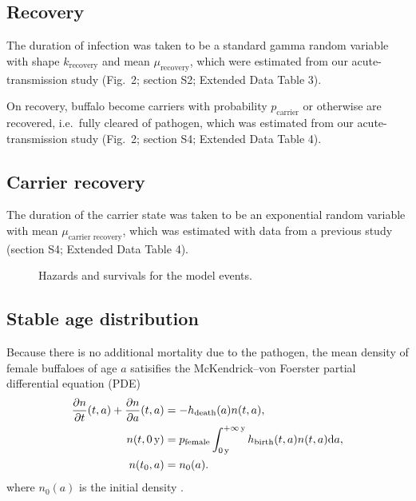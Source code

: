 \documentclass[12pt, USenglish]{article}  %
\newcommand{\md}{\mathrm{d}}
\begin{document}
\subsection{Recovery}

The duration of infection was taken to be a standard gamma random
variable with shape $k_{\text{recovery}}$ and mean
$\mu_{\text{recovery}}$, which were estimated from our
acute-transmission study (Fig.~2; section S2; Extended Data Table 3).

On recovery, buffalo become carriers with probability
$p_{\text{carrier}}$ or otherwise are recovered, i.e.~fully cleared of
pathogen, which was estimated from our acute-transmission study
(Fig.~2; section S4; Extended Data Table 4).


\subsection{Carrier recovery}
\label{carrier_recovery}

The duration of the carrier state was taken to be an exponential
random variable with mean $\mu_{\text{carrier recovery}}$,
which was estimated with data from a previous study (section S4;
Extended Data Table 4).


\begin{figure}
  \centering
  \begin{sansmath}
    
  \end{sansmath}
  \caption{Hazards and survivals for the model events.}
  \label{fig:distributions}
\end{figure}


\subsection{Stable age distribution}
\label{stable_age_distribution}

Because there is no additional mortality due to the pathogen, the mean
density of female buffaloes of age $a$ satisifies the McKendrick--von
Foerster partial differential equation (PDE)
\begin{equation}
  \label{PDE}
  \begin{split}
    \frac{\partial n}{\partial t}(t, a)
    + \frac{\partial n}{\partial a}(t, a)
    &= - h_{\text{death}}(a) n(t, a),
    \\
    n(t, \unit[0]{y}) &=
    p_{\text{female}}
    \int_{\unit[0]{y}}^{\unit[+\infty]{y}}
    h_{\text{birth}}(t, a) n(t, a) \md a,
    \\
    n(t_0, a) &= n_0(a).
  \end{split}
\end{equation}
where $n_0(a)$ is the initial density
\AtNextCite{\renewcommand{\multicitedelim}{\addsemicolon\space}}%
\autocites[pp.~159--161]{harris_1963}[pp.~353--364]{kot_01}.
\end{document}
